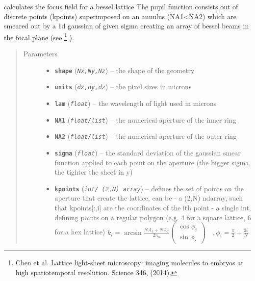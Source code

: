 \documentclass[a4paper,10pt,english]{sphinxmanual}
\begin{document}
\begin{fulllineitems}
\label{beams:biobeam.focus_field_lattice}
calculates the focus field for a bessel lattice
The pupil function consists out of discrete points (kpoints) superimposed on an annulus (NA1\textless{}NA2)
which are smeared out by a 1d gaussian of given sigma creating an array of bessel beams in the
focal plane (see \footnote[3]{
Chen et al. Lattice light-sheet microscopy: imaging molecules to embryos at high spatiotemporal resolution. Science 346, (2014).
} ).
\begin{quote}\begin{description}
\item[{Parameters}] \leavevmode\begin{itemize}
\item {} 
\textbf{\texttt{shape}} (\emph{\texttt{Nx,Ny,Nz}}) -- the shape of the geometry

\item {} 
\textbf{\texttt{units}} (\emph{\texttt{dx,dy,dz}}) -- the pixel sizes in microns

\item {} 
\textbf{\texttt{lam}} (\emph{\texttt{float}}) -- the wavelength of light used in microns

\item {} 
\textbf{\texttt{NA1}} (\emph{\texttt{float/list}}) -- the numerical aperture of the inner ring

\item {} 
\textbf{\texttt{NA2}} (\emph{\texttt{float/list}}) -- the numerical aperture of the outer ring

\item {} 
\textbf{\texttt{sigma}} (\emph{\texttt{float}}) -- the standard deviation of the gaussian smear function applied to each point on the aperture
(the bigger sigma, the tighter the sheet in y)

\item {} 
\textbf{\texttt{kpoints}} (\emph{\texttt{int/ (2,N) array}}) -- defines the set of points on the aperture that create the lattice, can be
- a (2,N) ndarray, such that kpoints{[}:,i{]} are the coordinates of the ith point
- a single int, defining points on a regular polygon (e.g. 4 for a square lattice, 6 for a hex lattice)
\(k_i = \arcsin\frac{NA_1+NA_2}{2 n_0} \begin{pmatrix} \cos \phi_i \\ \sin \phi_i \end{pmatrix}\quad, \phi_i = \frac{\pi}{2}+\frac{2i}{N}\)


\end{itemize}
\end{description}
\end{quote}
\end{fulllineitems}
\end{document}
